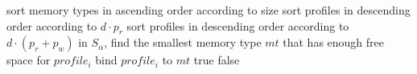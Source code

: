 \setlength{\textfloatsep}{0.2cm}
\begin{algorithm2e}[htb]
		sort memory types in ascending order according to size\;
		{
			sort profiles in descending order according to $d \cdot p_{r}$\;
		}
		{
			sort profiles in descending order according to $d \cdot \left( p_{r} + p_{w} \right)$\;
		}
		{
			in $S_{\alpha}$, find the smallest memory type $mt$ that has enough free space for $profile_{i}$\;
			bind $profile_{i}$ to $mt$\;
		}
		{
			\Return true\;
		}
		{
			\Return false\;
		}
	\caption{$SortedBind()$}
	\label{algo:sort_bind}
\end{algorithm2e}
\setlength{\textfloatsep}{0.2cm}
